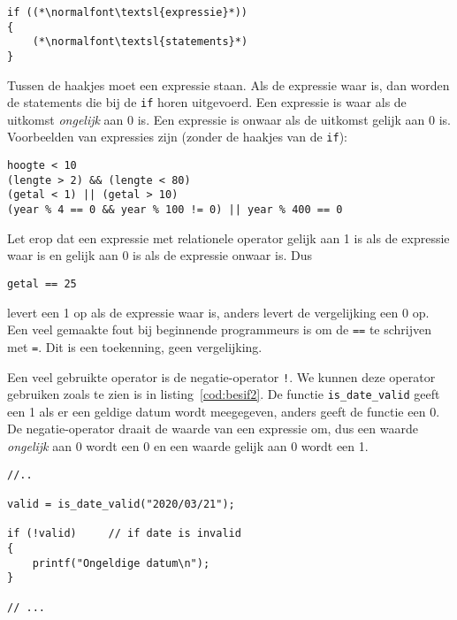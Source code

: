 \begin{lstlisting}[caption=Algemene opzet van het \texttt{if}-statement.,label=cod:besif1]
if ((*\normalfont\textsl{expressie}*))
{
    (*\normalfont\textsl{statements}*)
}
\end{lstlisting}

Tussen de haakjes moet een expressie staan. Als de expressie waar is, dan worden de statements die bij de \texttt{if} horen uitgevoerd. Een expressie is waar als de uitkomst \textsl{ongelijk} aan 0 is. Een expressie is onwaar als de uitkomst gelijk aan 0 is. Voorbeelden van expressies zijn (zonder de haakjes van de \texttt{if}):

\hspace*{1em}\texttt{hoogte < 10}\\
\hspace*{1em}\texttt{(lengte > 2) \&\& (lengte < 80)}\\
\hspace*{1em}\texttt{(getal < 1) || (getal > 10)}\\
\hspace*{1em}\texttt{(year \% 4 == 0 \&\& year \% 100 != 0) || year \% 400 == 0}

Let erop dat een expressie met relationele operator gelijk aan 1 is als de expressie waar is en gelijk aan 0 is als de expressie onwaar is. Dus

\hspace*{1em}\texttt{getal == 25}

levert een 1 op als de expressie waar is, anders levert de vergelijking een 0 op. Een veel gemaakte fout bij beginnende programmeurs is om de \texttt{==} te schrijven met \texttt{=}. Dit is een toekenning, geen vergelijking. %

Een veel gebruikte operator is de negatie-operator \texttt{!}. We kunnen deze operator gebruiken zoals te zien is in listing~\ref{cod:besif2}. De functie \texttt{is\_date\_valid} geeft een 1 als er een geldige datum wordt meegegeven, anders geeft de functie een 0. De negatie-operator draait de waarde van een expressie om, dus een waarde \textsl{ongelijk} aan 0 wordt een 0 en een waarde gelijk aan 0 wordt een 1.

\begin{lstlisting}[caption=Gebruik van de negatie-operator.,label=cod:besif2]
//..

valid = is_date_valid("2020/03/21");

if (!valid)     // if date is invalid
{
    printf("Ongeldige datum\n");
}

// ...
\end{lstlisting}


